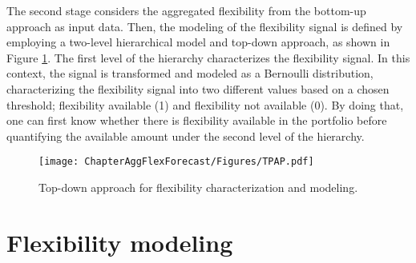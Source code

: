 The second stage considers the aggregated flexibility from the bottom-up approach as input data. Then, the modeling of the flexibility signal is defined by employing a two-level hierarchical model and top-down approach, as shown in Figure \ref{fig:top_down}. The first level of the hierarchy characterizes the flexibility signal. In this context, the signal is transformed and modeled as a Bernoulli distribution, characterizing the flexibility signal into two different values based on a chosen threshold; flexibility available (1) and flexibility not available (0). By doing that, one can first know whether there is flexibility available in the portfolio before quantifying the available amount under the second level of the hierarchy. 

\begin{figure}[htbp]
\centerline{\texttt{[image: ChapterAggFlexForecast/Figures/TPAP.pdf]}}
\caption{Top-down approach for flexibility characterization and modeling.}
\label{fig:top_down}
\end{figure}

\section{Flexibility modeling} \label{Sect:FlexModeling}
